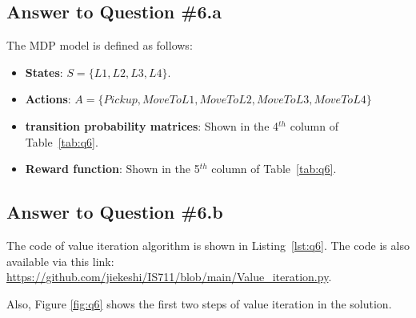 \documentclass[conference]{styles/acmsiggraph}
\begin{document}
\subsection{Answer to Question \#6.a}
The MDP model is defined as follows:
\begin{itemize}[leftmargin=*]
	\setlength{\itemsep}{0pt}
	\setlength{\parsep}{0pt}
	\setlength{\parskip}{0pt}
	\item \textbf{States}: $S = \{L1, L2, L3, L4\}$.
	\item \textbf{Actions}: $A = \{Pickup, MoveToL1, MoveToL2, MoveToL3, MoveToL4\}$
	\item \textbf{transition probability matrices}: Shown in the 4$^{th}$ column of Table~\ref{tab:q6}.
	\item \textbf{Reward function}: Shown in the 5$^{th}$ column of Table~\ref{tab:q6}.
\end{itemize}


\subsection{Answer to Question \#6.b}
The code of value iteration algorithm is shown in Listing~\ref{lst:q6}. The code is also available via this link: \url{https://github.com/jiekeshi/IS711/blob/main/Value_iteration.py}.

Also, Figure \ref{fig:q6} shows the first two steps of value iteration in the solution.
\end{document}
